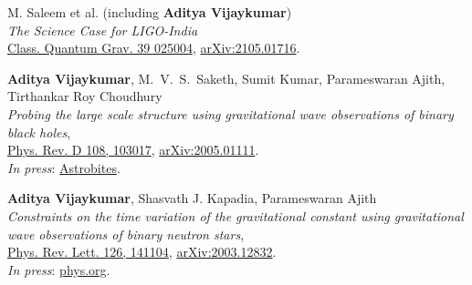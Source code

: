 \begin{etaremune}
	\item M. Saleem et al. (including \textbf{Aditya Vijaykumar})\\
	\textit{The Science Case for LIGO-India}\\
	\href{https://iopscience.iop.org/article/10.1088/1361-6382/ac3b99}{Class. Quantum Grav. 39 025004}, \href{https://arxiv.org/abs/2105.01716}{arXiv:2105.01716}.
	
	\item 
	\textbf{Aditya Vijaykumar}, M.~V.~S.~Saketh, Sumit Kumar, Parameswaran Ajith, Tirthankar Roy Choudhury\\
	\textit{Probing the large scale structure using gravitational wave observations of binary black holes},\\
	\href{https://journals.aps.org/prd/abstract/10.1103/PhysRevD.108.103017}{Phys. Rev. D 108, 103017}, \href{https://arxiv.org/abs/2005.01111}{arXiv:2005.01111}.\\
	\textit{In press}: \href{https://astrobites.org/2020/05/07/binary-black-holes-tangled-up-in-the-cosmic-web/}{Astrobites}.
	
	\item 
	\textbf{Aditya Vijaykumar}, Shasvath J. Kapadia, Parameswaran Ajith\\
	\textit{Constraints on the time variation of the gravitational constant using gravitational wave observations of binary neutron stars},\\
	\href{https://journals.aps.org/prl/abstract/10.1103/PhysRevLett.126.141104}{{Phys. Rev. Lett}. 126, 141104}, \href{https://arxiv.org/abs/2003.12832}{arXiv:2003.12832}.\\
	\textit{In press}: \href{https://phys.org/news/2021-05-constraints-variation-gravitational-constant.html}{phys.org}.

\end{etaremune}

